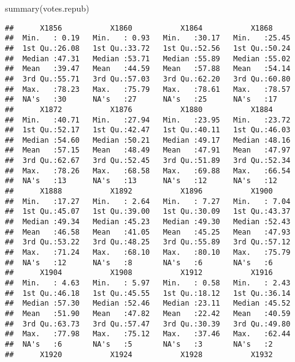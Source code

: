 \documentclass[
]{article}
\newenvironment{Shaded}{\begin{snugshade}}{\end{snugshade}}
\newcommand{\FunctionTok}[1]{\textcolor[rgb]{0.00,0.00,0.00}{#1}}
\newcommand{\NormalTok}[1]{#1}
\begin{document}
\begin{Shaded}
\begin{Highlighting}[]
\FunctionTok{summary}\NormalTok{(votes.repub)}
\end{Highlighting}
\end{Shaded}

\begin{verbatim}
##      X1856           X1860           X1864           X1868      
##  Min.   : 0.19   Min.   : 0.93   Min.   :30.17   Min.   :25.45  
##  1st Qu.:26.08   1st Qu.:33.72   1st Qu.:52.56   1st Qu.:50.24  
##  Median :47.31   Median :53.71   Median :55.89   Median :55.02  
##  Mean   :39.47   Mean   :44.59   Mean   :57.88   Mean   :54.14  
##  3rd Qu.:55.71   3rd Qu.:57.03   3rd Qu.:62.20   3rd Qu.:60.80  
##  Max.   :78.23   Max.   :75.79   Max.   :78.61   Max.   :78.57  
##  NA's   :30      NA's   :27      NA's   :25      NA's   :17     
##      X1872           X1876           X1880           X1884      
##  Min.   :40.71   Min.   :27.94   Min.   :23.95   Min.   :23.72  
##  1st Qu.:52.17   1st Qu.:42.47   1st Qu.:40.11   1st Qu.:46.03  
##  Median :54.60   Median :50.21   Median :49.17   Median :48.16  
##  Mean   :57.15   Mean   :48.49   Mean   :47.91   Mean   :47.97  
##  3rd Qu.:62.67   3rd Qu.:52.45   3rd Qu.:51.89   3rd Qu.:52.34  
##  Max.   :78.26   Max.   :68.58   Max.   :69.88   Max.   :66.54  
##  NA's   :13      NA's   :13      NA's   :12      NA's   :12     
##      X1888           X1892           X1896           X1900      
##  Min.   :17.27   Min.   : 2.64   Min.   : 7.27   Min.   : 7.04  
##  1st Qu.:45.07   1st Qu.:39.00   1st Qu.:30.09   1st Qu.:43.37  
##  Median :49.34   Median :45.23   Median :49.30   Median :52.43  
##  Mean   :46.58   Mean   :41.05   Mean   :45.25   Mean   :47.93  
##  3rd Qu.:53.22   3rd Qu.:48.25   3rd Qu.:55.89   3rd Qu.:57.12  
##  Max.   :71.24   Max.   :68.10   Max.   :80.10   Max.   :75.79  
##  NA's   :12      NA's   :8       NA's   :6       NA's   :6      
##      X1904           X1908           X1912           X1916      
##  Min.   : 4.63   Min.   : 5.97   Min.   : 0.58   Min.   : 2.43  
##  1st Qu.:46.18   1st Qu.:45.55   1st Qu.:18.12   1st Qu.:36.14  
##  Median :57.30   Median :52.46   Median :23.11   Median :45.52  
##  Mean   :51.90   Mean   :47.82   Mean   :22.42   Mean   :40.59  
##  3rd Qu.:63.73   3rd Qu.:57.47   3rd Qu.:30.39   3rd Qu.:49.80  
##  Max.   :77.98   Max.   :75.12   Max.   :37.46   Max.   :62.44  
##  NA's   :6       NA's   :5       NA's   :3       NA's   :2      
##      X1920           X1924           X1928           X1932      

\end{verbatim}
\end{document}
